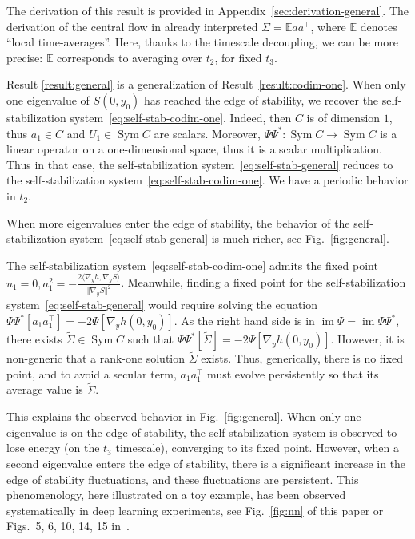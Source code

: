 \documentclass[11pt,english,reqno]{article}
\DeclareMathOperator{\im}{im}
\DeclareMathOperator{\Sym}{Sym}
\newcommand{\E}{\mathbb{E}}
\theoremstyle{plain}
\theoremstyle{definition}
\theoremstyle{remark}
\numberwithin{equation}{section}
\begin{document}
The derivation of this result is provided in Appendix~\ref{sec:derivation-general}. The derivation of the central flow in \cite{cohen2024understanding} already interpreted $\Sigma = \E aa^\top $, where $\E$ denotes ``local time-averages''. Here, thanks to the timescale decoupling, we can be more precise: $\E$ corresponds to averaging over $t_2$, for fixed $t_3$.

Result \ref{result:general} is a generalization of Result~\ref{result:codim-one}. When only one eigenvalue of $S(0,y_0)$ has reached the edge of stability, we recover the self-stabilization system~\eqref{eq:self-stab-codim-one}. Indeed, then $C$ is of dimension $1$, thus $a_1 \in C$ and $U_1 \in \Sym C$ are scalars. Moreover, $\Psi\Psi^*: \Sym C \to \Sym C$ is a linear operator on a one-dimensional space, thus it is a scalar multiplication. Thus in that case, the self-stabilization system~\eqref{eq:self-stab-general} reduces to the self-stabilization system~\eqref{eq:self-stab-codim-one}. We have a periodic behavior in $t_2$. 

When more eigenvalues enter the edge of stability, the behavior of the self-stabilization system~\eqref{eq:self-stab-general} is much richer, see Fig.~\ref{fig:general}. 

The self-stabilization system~\eqref{eq:self-stab-codim-one} admits the fixed point $u_1 = 0, a_1^2 = -\frac{2 \langle \nabla_y h, \nabla_y S \rangle}{\Vert \nabla_y S \Vert^2}$. Meanwhile, finding a fixed point for the self-stabilization system~\eqref{eq:self-stab-general} would require solving the equation $\Psi\Psi^*[a_1 a_1^\top] = - 2 \Psi[\nabla_y h(0, y_0)]$. As the right hand side is in $\im \Psi = \im \Psi\Psi^*$, there exists $\widetilde{\Sigma} \in \Sym C$ such that $\Psi\Psi^*[\widetilde{\Sigma}] = -2 \Psi[\nabla_y h(0, y_0)]$. However, it is non-generic that a rank-one solution $\widetilde{\Sigma}$ exists. Thus, generically, there is no fixed point, and to avoid a secular term, $a_1 a_1^\top$ must evolve persistently so that its average value is $\widetilde{\Sigma}$.

This explains the observed behavior in Fig.~\ref{fig:general}. When only one eigenvalue is on the edge of stability, the self-stabilization system is observed to lose energy (on the $t_3$ timescale), converging to its fixed point. However, when a second eigenvalue enters the edge of stability, there is a significant increase in the edge of stability fluctuations, and these fluctuations are persistent. This phenomenology, here illustrated on a toy example, has been observed systematically in deep learning experiments, see Fig.~\ref{fig:nn} of this paper or Figs.~5, 6, 10, 14, 15 in~\cite{cohen2024understanding}.
\end{document}
